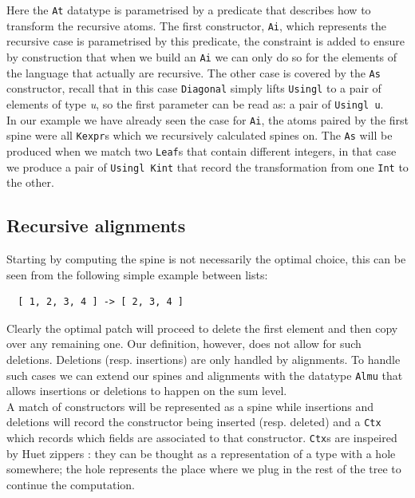 \documentclass[11pt, titlepage]{article}
\begin{document}
Here the \texttt{At} datatype is parametrised by a predicate that describes how 
to transform the recursive atoms. 
The first constructor, \texttt{Ai}, which represents the recursive case is 
parametrised by this predicate, the constraint is added to ensure by construction 
that when we build an \texttt{Ai} we can only do so for the elements of the 
language that actually are recursive.
The other case is covered by the \texttt{As} constructor, recall that in this case \texttt{Diagonal} simply lifts 
\texttt{Usingl} to a pair of elements of type \emph{u}, so the first parameter 
can be read as: a pair of \texttt{Usingl u}.
\\
In our example we have already seen the case for \texttt{Ai}, the atoms paired 
by the first spine were all \texttt{Kexpr}s which we recursively calculated spines on. 
The \texttt{As} will be produced when we match two \texttt{Leaf}s that contain 
different integers, in that case we produce a pair of \texttt{Usingl Kint} that record 
the transformation from one \texttt{Int} to the other.

\subsection{Recursive alignments}\label{recursive alignments}

Starting by computing the spine is not necessarily the optimal choice, this can 
be seen from the following simple example between lists:

\begin{verbatim}
  [ 1, 2, 3, 4 ] -> [ 2, 3, 4 ]
\end{verbatim}
Clearly the optimal patch will proceed to delete the first element and then 
copy over any remaining one. Our definition, however, does not allow for such 
deletions. Deletions (resp. insertions) are only handled by alignments. To 
handle such cases we can extend our spines and alignments with the datatype 
\texttt{Almu} that allows insertions or deletions to happen on the sum level.
\\
A match of constructors will be represented as a spine while insertions and 
deletions will record the constructor being inserted (resp. deleted) and a 
\texttt{Ctx} which records which fields are associated to that constructor.
\texttt{Ctx}s are inspeired by Huet zippers \cite{zippers}: they can be thought as a representation 
of a type with a hole somewhere; the hole represents the place where we 
plug in the rest of the tree to continue the computation.
\end{document}
